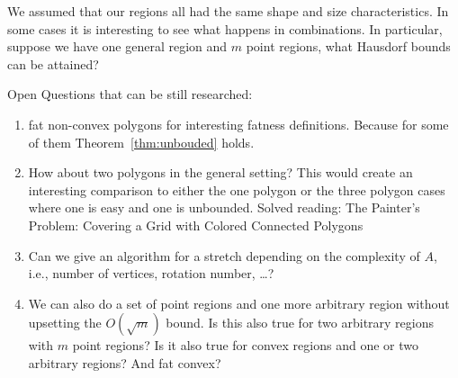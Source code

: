 \documentclass[a4paper,UKenglish,cleveref]{lipics-v2019}
\begin{document}
We assumed that our regions all had the same shape and size characteristics. In some cases it is interesting to see what happens in combinations. In particular, suppose we have one general region and $m$ point regions, what Hausdorf bounds can be attained?


Open Questions that can be still researched:
\begin{enumerate}
	\item fat non-convex polygons for interesting fatness definitions. Because for some of them Theorem~\ref{thm:unbouded} holds.
	\item How about two polygons in the general setting? This would create an interesting comparison to either the one polygon or the three polygon cases where one is easy and one is unbounded.
	Solved reading: The Painter’s Problem: Covering a Grid with Colored Connected Polygons
	\item Can we give an algorithm for a stretch depending on the complexity of $A$, i.e., number of vertices, rotation number, \dots?
	\item We can also do a set of point regions and one more arbitrary region without upsetting the $O(\sqrt{m})$ bound. Is this also true for two arbitrary regions with $m$ point regions? Is it also true for convex regions and one or two arbitrary regions? And fat convex?
\end{enumerate}


\newpage
\appendix




\end{document}
